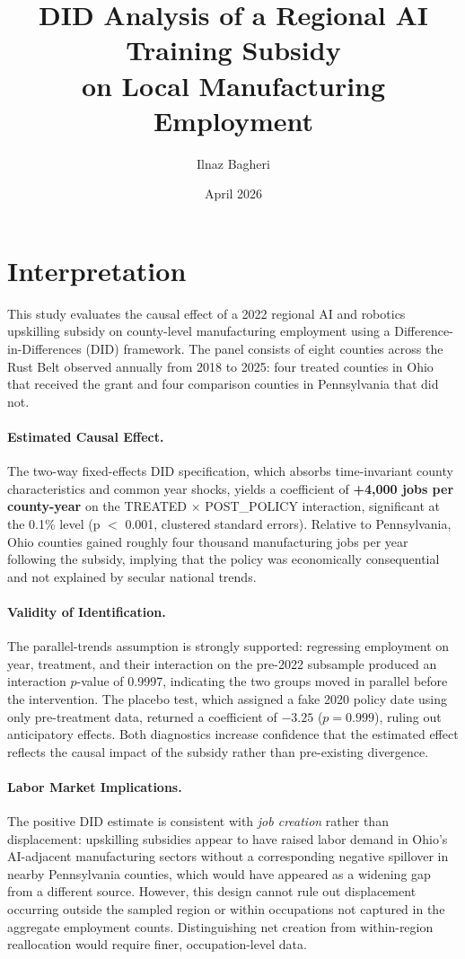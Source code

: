 \documentclass[12pt]{article}
\title{DID Analysis of a Regional AI Training Subsidy\\on Local Manufacturing Employment}
\author{Ilnaz Bagheri}
\date{April 2026}
\begin{document}
\maketitle

\section*{Interpretation}

This study evaluates the causal effect of a 2022 regional AI and robotics upskilling subsidy on county-level manufacturing employment using a Difference-in-Differences (DID) framework. The panel consists of eight counties across the Rust Belt observed annually from 2018 to 2025: four treated counties in Ohio that received the grant and four comparison counties in Pennsylvania that did not.

\paragraph{Estimated Causal Effect.} The two-way fixed-effects DID specification, which absorbs time-invariant county characteristics and common year shocks, yields a coefficient of \textbf{+4{,}000 jobs per county-year} on the TREATED $\times$ POST\_POLICY interaction, significant at the 0.1\% level (p $<$ 0.001, clustered standard errors). Relative to Pennsylvania, Ohio counties gained roughly four thousand manufacturing jobs per year following the subsidy, implying that the policy was economically consequential and not explained by secular national trends.

\paragraph{Validity of Identification.} The parallel-trends assumption is strongly supported: regressing employment on year, treatment, and their interaction on the pre-2022 subsample produced an interaction $p$-value of 0.9997, indicating the two groups moved in parallel before the intervention. The placebo test, which assigned a fake 2020 policy date using only pre-treatment data, returned a coefficient of $-3.25$ ($p = 0.999$), ruling out anticipatory effects. Both diagnostics increase confidence that the estimated effect reflects the causal impact of the subsidy rather than pre-existing divergence.

\paragraph{Labor Market Implications.} The positive DID estimate is consistent with \textit{job creation} rather than displacement: upskilling subsidies appear to have raised labor demand in Ohio's AI-adjacent manufacturing sectors without a corresponding negative spillover in nearby Pennsylvania counties, which would have appeared as a widening gap from a different source. However, this design cannot rule out displacement occurring outside the sampled region or within occupations not captured in the aggregate employment counts. Distinguishing net creation from within-region reallocation would require finer, occupation-level data.
\end{document}
